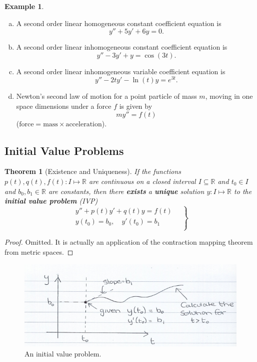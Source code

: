 \documentclass{article}
\theoremstyle{plain}
\newtheorem{thm}{Theorem}[section]
\theoremstyle{definition}
\newtheorem{exmp}{Example}[section]
\numberwithin{equation}{section}
\begin{document}
\begin{tcolorbox}
\begin{exmp}\hfill
\begin{enumerate}[(a)]
    \item A second order linear homogeneous constant coefficient equation is
    $$ y'' + 5y' + 6y = 0.$$
    \item A second order linear inhomogeneous constant coefficient equation is
    $$ y'' - 3y' + y = \cos(3t).$$
    \item A second order linear inhomogeneous variable coefficient equation is
    $$ y'' - 2ty' - \ln(t)y = e^{3t}.$$
    \item Newton's second law of motion for a point particle of mass $m$, moving in one space dimensions under a force $f$ is given by
    $$ my'' = f(t)$$
    ($\text{force} = \text{mass} \times \text{acceleration}$).
\end{enumerate}
\end{exmp}
\end{tcolorbox}

\subsection{Initial Value Problems}

\begin{thm}[Existence and Uniqueness]\label{thm:Existenceanduniqueness}
If the functions $p(t),q(t),f(t):I \mapsto \mathbb{R}$ are continuous on a closed interval $I \subseteq \mathbb{R}$ and $t_0 \in I$ and $b_0,b_1 \in \mathbb{R}$ are constants, then there \textbf{exists} a \textbf{unique} solution $y: I \mapsto \mathbb{R}$ to the \textbf{initial value problem} (IVP)
\begin{equation}\label{eq:linearIVP}
\left.
\begin{aligned}
    y'' + p(t)y' + q(t)y = f(t) \\
    y(t_0) = b_0, \quad y'(t_0) = b_1 \\
\end{aligned}\quad\right\rbrace
\end{equation}
\end{thm}

\begin{proof}
    Omitted. It is actually an application of the contraction mapping theorem from metric spaces.
\end{proof}

\begin{figure}[h]
    \centering
    \includegraphics{images/Ivpgraph.png}
    \caption{An initial value problem.}
    \label{fig:ivpgraph}
\end{figure}
\end{document}
